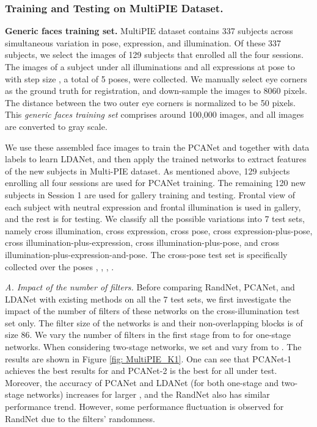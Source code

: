 \documentclass[10pt,journal,compsoc]{IEEEtran}
\begin{document}
\subsubsection{Training and Testing on MultiPIE Dataset.}\label{sec: MultiPIE}
{\bf Generic faces training set.} MultiPIE dataset \cite{Gross2008} contains 337 subjects across simultaneous variation in pose, expression, and illumination. Of these 337 subjects, we select the images of 129 subjects that enrolled all the four sessions. The images of a subject under all illuminations and all expressions at pose  to  with step size , a total of 5 poses, were collected. We manually select eye corners as the ground truth for registration, and down-sample the images to 8060 pixels. The distance between the two outer eye corners is normalized to be 50 pixels. This {\em generic faces training set} comprises around 100,000 images, and all images are converted to gray scale.

We use these assembled face images to train the PCANet and together with data labels to learn LDANet, and then apply the trained networks to extract features of the new subjects in Multi-PIE dataset. As mentioned above, 129 subjects enrolling all four sessions are used for PCANet training. The remaining 120 new subjects in Session 1 are used for gallery training and testing. Frontal view of each subject with neutral expression and frontal illumination is used in gallery, and the rest is for testing. We classify all the possible variations into 7 test sets, namely cross illumination, cross expression, cross pose, cross expression-plus-pose, cross illumination-plus-expression, cross illumination-plus-pose, and cross illumination-plus-expression-and-pose. The cross-pose test set is specifically collected over the poses , , , .



\vspace{0.3\baselineskip}
{\em A. Impact of the number of filters.} Before comparing RandNet, PCANet, and LDANet with existing methods on all the 7 test sets, we first investigate the impact of the number of filters of these networks on the cross-illumination test set only. The filter size of the networks is  and their non-overlapping blocks is of size 86. We vary the number of filters in the first stage  from  to  for one-stage networks. When considering two-stage networks, we set  and vary  from  to . The results are shown in Figure \ref{fig: MultiPIE_K1}. One can see that PCANet-1 achieves the best results for  and PCANet-2 is the best for all  under test. Moreover, the accuracy of PCANet and LDANet (for both one-stage and two-stage networks) increases for larger , and the RandNet also has similar performance trend. However, some performance fluctuation is observed for RandNet due to the filters' randomness.
\end{document}
